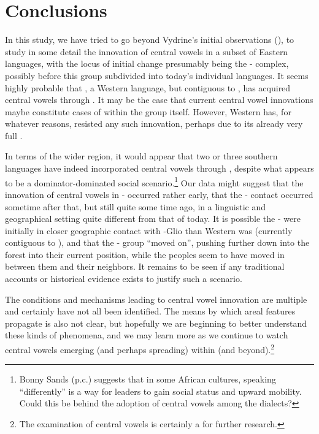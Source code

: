 \documentclass[output=paper,newtxmath,modfonts,nonflat,draft]{langsci/langscibook}
\begin{document}
\section{Conclusions}\label{sec:zogbo:7} 

In this study, we have tried to go beyond Vydrine’s initial observations (\citeyear{Vydrine2009}), to study in some detail the innovation of central vowels in a subset of Eastern  languages, with the locus of initial change presumably being the -  complex, possibly before this group subdivided into today’s individual languages. It seems highly probable that , a Western  language, but contiguous to , has acquired central vowels through .  It may be the case that current central vowel innovations maybe constitute cases of  within the  group itself. However, Western  has, for whatever reasons, resisted any such innovation, perhaps due to its already very full .  

In terms of the wider region, it would appear that two or three southern  languages have indeed incorporated central vowels through , despite what appears to be a dominator-dominated social scenario.\footnote{Bonny Sands (p.c.) suggests that in some African cultures, speaking “differently” is a way for leaders to gain social status and upward mobility.  Could this be behind the adoption of  central vowels among the  dialects?} Our data might suggest that the innovation of central vowels in - occurred rather early, that the - contact occurred sometime after that, but still quite some time ago, in a linguistic and geographical setting quite different from that of today.  It is possible the -  were initially in closer geographic contact with -Glio than Western  was (currently contiguous to ), and that the -  group “moved on”, pushing further down into the forest into their current position, while the  peoples seem to have moved in between them and their  neighbors. It remains to be seen if any traditional accounts or historical evidence exists to justify such a scenario.  

The conditions and mechanisms leading to central vowel innovation are multiple and certainly have not all been identified.  The means by which areal features propagate is also not clear, but hopefully we are beginning to better understand these kinds of phenomena, and we may learn more as we continue to watch central vowels emerging (and perhaps spreading) within  (and beyond).\footnote{The examination of  central vowels is certainly a  for further research.} 
\end{document}

